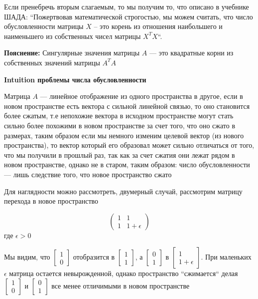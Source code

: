 \documentclass{article}
\begin{document}
    Если пренебречь вторым слагаемым, то мы получим то, что описано в учебнике ШАДА: 
    ``Пожертвовав математической строгостью, мы можем считать, что число обусловленности матрицы $X$ – 
    это корень из отношения наибольшего и наименьшего из собственных чисел матрицы $X^{T}X$``.
    \quad

    \textbf{Пояснение:}
    Сингулярные значения матрицы $A$ --- это квадратные корни из собственных значений матрицы $A^{T}A$

    \quad

    \textbf{Intuition проблемы числа обусловленности}

    \quad

    Матрица $A$ --- линейное отображение из одного пространства в другое, если в новом пространстве есть вектора с сильной линейной связью, то
    оно становится более сжатым, т.е непохожие вектора в исходном пространстве могут стать сильно более похожими в новом пространстве за счет того,
    что оно сжато в размерах, таким образом если мы немного изменим целевой вектор (из нового пространства), то вектор который его образовал может сильно отличаться от того, что мы
    получили в прошлый раз, так как за счет сжатия они лежат рядом в новом пространстве, однако не в старом, таким образом: число обусловленности ---
    лишь следствие того, что новое пространство сжато

    Для наглядности можно рассмотреть, двумерный случай,
    рассмотрим матрицу перехода в новое пространство

    \[
    \begin{pmatrix}
    1 & 1 \\

    1 & 1 + \epsilon
    \end{pmatrix}
    \]
    где $\epsilon > 0$

    Мы видим, что $ \left[ \begin{smallmatrix} 1 \\ 0 \end{smallmatrix} \right] $ отобразится в $ \left[ \begin{smallmatrix} 1 \\ 1 \end{smallmatrix} \right] $, а
    $ \left[ \begin{smallmatrix} 0 \\ 1 \end{smallmatrix} \right] $ в $ \left[ \begin{smallmatrix} 1 \\ 1 + \epsilon \end{smallmatrix} \right] $.
    При маленьких $\epsilon$ матрица остается невырожденной, однако пространство ``сжимается`` делая $ \left[ \begin{smallmatrix} 1 \\ 0 \end{smallmatrix} \right] $ и
    $ \left[ \begin{smallmatrix} 0 \\ 1 \end{smallmatrix} \right] $ все менее отличимыми в новом пространстве
\end{document}
